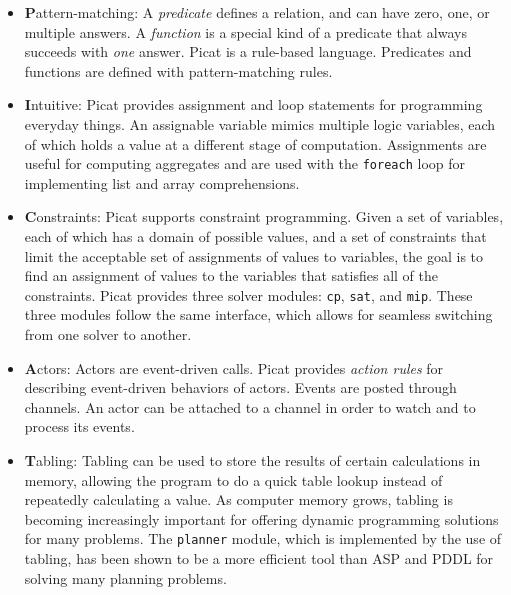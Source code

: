 \begin{itemize}
\item \textbf{P}attern-matching: A \emph{predicate} defines a relation, and can have zero, one, or multiple answers. A \emph{function} is a special kind of a predicate that always succeeds with \emph{one} answer. Picat is a rule-based language. Predicates and functions are defined with pattern-matching rules.

\item \textbf{I}ntuitive: Picat provides assignment and loop statements for programming everyday things. An assignable variable mimics multiple logic variables, each of which holds a value at a different stage of computation. Assignments are useful for computing aggregates and are used with the {\tt foreach} loop for implementing list and array comprehensions.

\item \textbf{C}onstraints: Picat supports constraint programming.  Given a set of variables, each of which has a domain of possible values, and a set of constraints that limit the acceptable set of assignments of values to variables, the goal is to find an assignment of values to the variables that satisfies all of the constraints. Picat provides three solver modules: {\tt cp}, {\tt sat}, and {\tt mip}. These three modules follow the same interface, which allows for seamless switching from one solver to another.

\item \textbf{A}ctors: Actors are event-driven calls.  Picat provides \emph{action rules} for describing event-driven behaviors of actors. Events are posted through channels. An actor can be attached to a channel in order to watch and to process its events.

\item \textbf{T}abling: Tabling can be used to store the results of certain calculations in memory, allowing the program to do a quick table lookup instead of repeatedly calculating a value. As computer memory grows, tabling is becoming increasingly important for offering dynamic programming solutions for many problems. The \texttt{planner} module, which is implemented by the use of tabling, has been shown to be a more efficient tool than ASP and PDDL for solving many planning problems.

\end{itemize}


